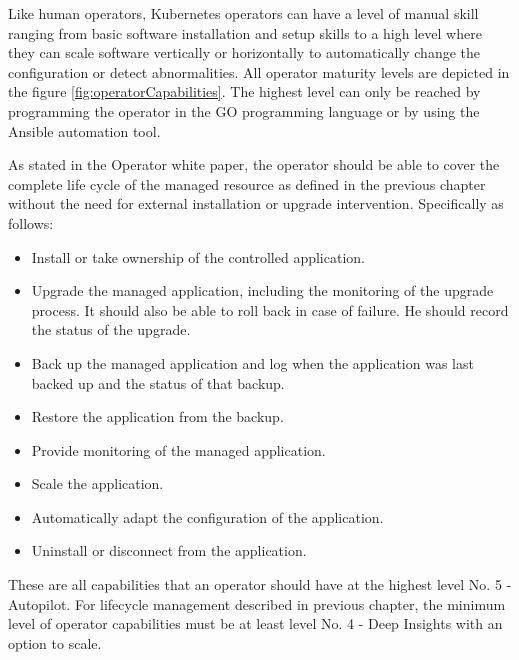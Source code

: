 
Like human operators, Kubernetes operators can have a level of manual skill ranging from basic software installation and setup skills to a high level where they can scale software vertically or horizontally to automatically change the configuration or detect abnormalities. All operator maturity levels are depicted in the figure \ref{fig:operatorCapabilities}. The highest level can only be reached by programming the operator in the GO programming language or by using the Ansible automation tool. \cite{operatorsOframework}


As stated in the Operator white paper, \cite{operatorWhitepaper} the operator should be able to cover the complete life cycle of the managed resource as defined in the previous chapter without the need for external installation or upgrade intervention. Specifically as follows:
\begin{itemize}
    \item Install or take ownership of the controlled application.
    \item Upgrade the managed application, including the monitoring of the upgrade process. It should also be able to roll back in case of failure. He should record the status of the upgrade.
    \item Back up the managed application and log when the application was last backed up and the status of that backup.
    \item Restore the application from the backup.
    \item Provide monitoring of the managed application.
    \item Scale the application.
    \item Automatically adapt the configuration of the application.
    \item Uninstall or disconnect from the application.
\end{itemize}

These are all capabilities that an operator should have at the highest level No. 5 - Autopilot. For lifecycle management described in previous chapter, the minimum level of operator capabilities must be at least level No. 4 - Deep Insights with an option to scale.

